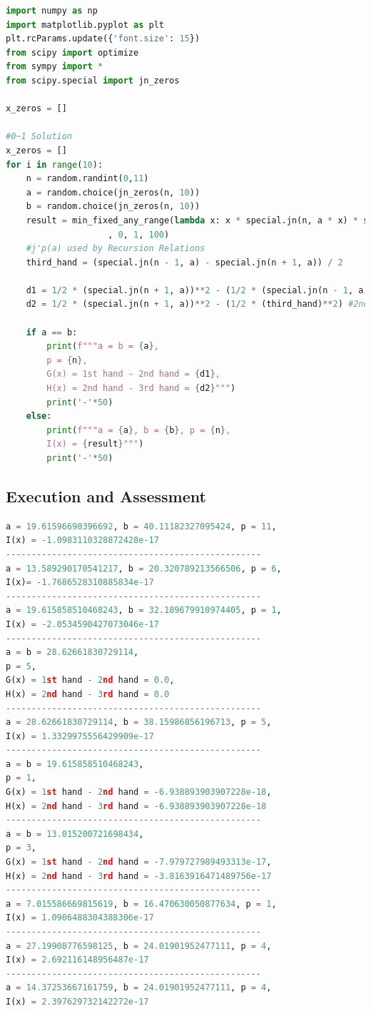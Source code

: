 \documentclass[11pt]{article}
\begin{document}
\begin{lstlisting}[language=Python]
import numpy as np
import matplotlib.pyplot as plt
plt.rcParams.update({'font.size': 15})
from scipy import optimize
from sympy import *
from scipy.special import jn_zeros 

x_zeros = []

#0~1 Solution
x_zeros = []
for i in range(10):
    n = random.randint(0,11)
    a = random.choice(jn_zeros(n, 10))
    b = random.choice(jn_zeros(n, 10))
    result = min_fixed_any_range(lambda x: x * special.jn(n, a * x) * special.jn(n, b * x) 
                    , 0, 1, 100)
    #j'p(a) used by Recursion Relations 
    third_hand = (special.jn(n - 1, a) - special.jn(n + 1, a)) / 2

    d1 = 1/2 * (special.jn(n + 1, a))**2 - (1/2 * (special.jn(n - 1, a))**2)# 1st hand - 2nd hand
    d2 = 1/2 * (special.jn(n + 1, a))**2 - (1/2 * (third_hand)**2) #2nd hand - 3rd hand
    
    if a == b:
        print(f"""a = b = {a},
        p = {n},
        G(x) = 1st hand - 2nd hand = {d1}, 
        H(x) = 2nd hand - 3rd hand = {d2}""")
        print('-'*50)
    else:
        print(f"""a = {a}, b = {b}, p = {n}, 
        I(x) = {result}""")
        print('-'*50)
        \end{lstlisting}

\subsection{Execution and Assessment}
\begin{lstlisting}[language=Python]
a = 19.61596690396692, b = 40.11182327095424, p = 11, 
I(x) = -1.0983110328872428e-17
--------------------------------------------------
a = 13.589290170541217, b = 20.320789213566506, p = 6, 
I(x)= -1.7686528310885834e-17
--------------------------------------------------
a = 19.615858510468243, b = 32.189679910974405, p = 1, 
I(x) = -2.0534590427073046e-17
--------------------------------------------------
a = b = 28.62661830729114,
p = 5,
G(x) = 1st hand - 2nd hand = 0.0, 
H(x) = 2nd hand - 3rd hand = 0.0
--------------------------------------------------
a = 28.62661830729114, b = 38.15986856196713, p = 5, 
I(x) = 1.3329975556429909e-17
--------------------------------------------------
a = b = 19.615858510468243,
p = 1,
G(x) = 1st hand - 2nd hand = -6.938893903907228e-18, 
H(x) = 2nd hand - 3rd hand = -6.938893903907228e-18
--------------------------------------------------
a = b = 13.015200721698434,
p = 3,
G(x) = 1st hand - 2nd hand = -7.979727989493313e-17, 
H(x) = 2nd hand - 3rd hand = -3.8163916471489756e-17
--------------------------------------------------
a = 7.015586669815619, b = 16.470630050877634, p = 1, 
I(x) = 1.0906488304388306e-17
--------------------------------------------------
a = 27.19908776598125, b = 24.01901952477111, p = 4, 
I(x) = 2.692116148956487e-17
--------------------------------------------------
a = 14.37253667161759, b = 24.01901952477111, p = 4, 
I(x) = 2.397629732142272e-17
\end{lstlisting}
 
\end{document}
